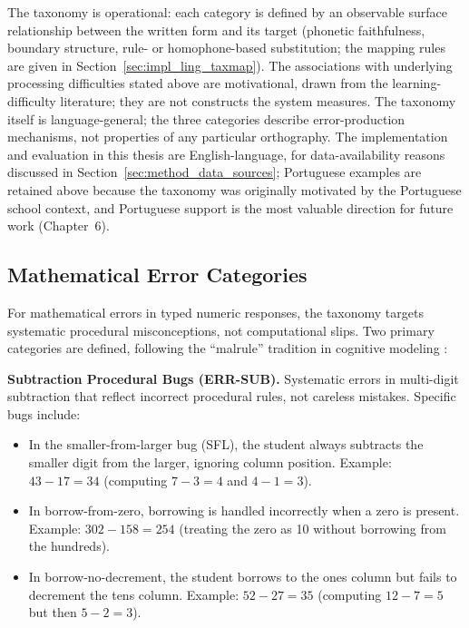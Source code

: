 The taxonomy is operational: each category is defined by an observable surface relationship between the written form and its target (phonetic faithfulness, boundary structure, rule- or homophone-based substitution; the mapping rules are given in Section~\ref{sec:impl_ling_taxmap}). The associations with underlying processing difficulties stated above are motivational, drawn from the learning-difficulty literature; they are not constructs the system measures. The taxonomy itself is language-general; the three categories describe error-production mechanisms, not properties of any particular orthography. The implementation and evaluation in this thesis are English-language, for data-availability reasons discussed in Section~\ref{sec:method_data_sources}; Portuguese examples are retained above because the taxonomy was originally motivated by the Portuguese school context, and Portuguese support is the most valuable direction for future work (Chapter~6).

\subsection{Mathematical Error Categories}
\label{sec:method_tax_math}

For mathematical errors in typed numeric responses, the taxonomy targets systematic procedural misconceptions, not computational slips. Two primary categories are defined, following the ``malrule'' tradition in cognitive modeling \parencite{VanLehn1990,BrownBurton1978}:

\textbf{Subtraction Procedural Bugs (ERR-SUB).} Systematic errors in multi-digit subtraction that reflect incorrect procedural rules, not careless mistakes. Specific bugs include:
\begin{itemize}
    \item In the smaller-from-larger bug (SFL), the student always subtracts the smaller digit from the larger, ignoring column position. Example: $43 - 17 = 34$ (computing $7-3=4$ and $4-1=3$).
    \item In borrow-from-zero, borrowing is handled incorrectly when a zero is present. Example: $302 - 158 = 254$ (treating the zero as 10 without borrowing from the hundreds).
    \item In borrow-no-decrement, the student borrows to the ones column but fails to decrement the tens column. Example: $52 - 27 = 35$ (computing $12-7=5$ but then $5-2=3$).
\end{itemize}

